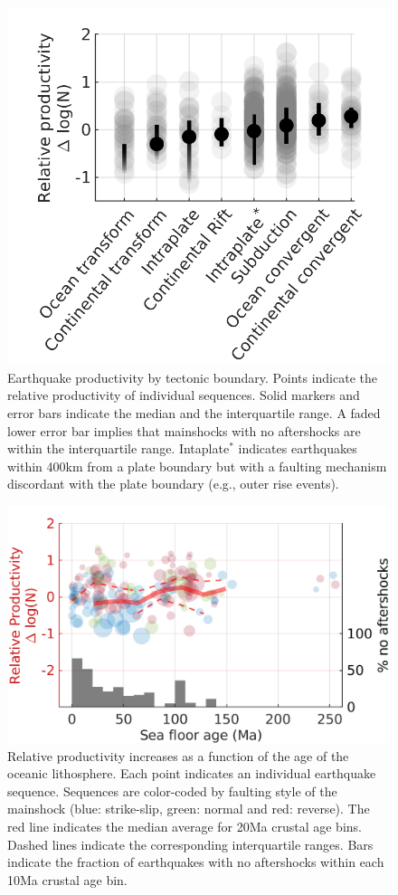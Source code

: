 \documentclass[draft]{agujournal}
\begin{document}
\begin{figure}
\centering
\includegraphics{figures/prod_by_pb_mw5.png}
\caption{Earthquake productivity by tectonic boundary. Points indicate the relative productivity of individual sequences. Solid markers and error bars indicate the median and the interquartile range. A faded lower error bar implies that mainshocks with no aftershocks are within the interquartile range. Intaplate$^*$ indicates earthquakes within 400km from a plate boundary but with a faulting mechanism discordant with the plate boundary (e.g., outer rise events).}
\label{fig:plate_boundary}
\end{figure}    


\begin{figure}
\centering
\includegraphics{figures/prod_vs_age_mw5.png}
\caption{Relative productivity increases as a function of the age of the oceanic lithosphere. Each point indicates an individual earthquake sequence. Sequences are color-coded by faulting style of the mainshock (blue: strike-slip, green: normal and red: reverse). The red line indicates the median average for 20Ma crustal age bins. Dashed lines indicate the corresponding interquartile ranges. Bars indicate the fraction of earthquakes with no aftershocks within each 10Ma crustal age bin.}
\label{fig:prod_vs_age}
\end{figure}   
\end{document}
